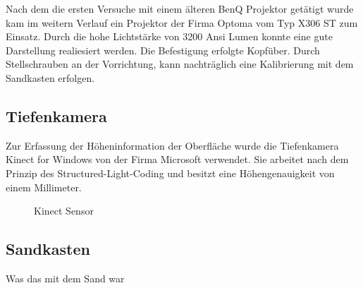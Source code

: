 \begin{Spacing}{\mylinespace}
Nach dem die ersten Versuche mit einem älteren BenQ Projektor getätigt wurde kam im weitern Verlauf ein Projektor der Firma Optoma vom Typ X306 ST zum Einsatz. Durch die hohe Lichtstärke von 3200 Ansi Lumen konnte eine gute Darstellung realiesiert werden. Die Befestigung erfolgte Kopfüber. Durch Stellschrauben an der Vorrichtung, kann nachträglich eine Kalibrierung mit dem Sandkasten erfolgen.

\subsection{Tiefenkamera}

Zur Erfassung der Höheninformation der Oberfläche wurde die Tiefenkamera Kinect for Windows von der Firma Microsoft verwendet. Sie arbeitet nach dem Prinzip des Structured-Light-Coding und besitzt eine Höhengenauigkeit von einem Millimeter. 

\begin{figure}[hbtp]
	\centering
	\hfill
	\caption{Kinect Sensor}
\end{figure}


\subsection{Sandkasten}

Was das mit dem Sand war\\

\end{Spacing}
\newpage
\clearpage
